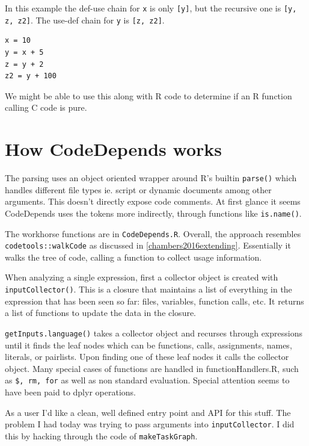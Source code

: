 \documentclass[12pt]{article}
\begin{document}
In this example the def-use chain for \texttt{x} is only \texttt{[y]}, but the
recursive one is \texttt{[y, z, z2]}. The use-def chain for \texttt{y} is
\texttt{[z, z2]}.

\begin{verbatim}
x = 10
y = x + 5
z = y + 2
z2 = y + 100
\end{verbatim}

We might be able to use this along with R code to determine if an R
function calling C code is pure.

\section{How CodeDepends works}

The parsing uses an object oriented wrapper around R's builtin \texttt{parse()}
which handles different file types ie. script or dynamic documents among other arguments.
This doesn't directly expose code comments.
At first glance it seems CodeDepends uses the tokens
more indirectly, through functions like \texttt{is.name()}. 

The workhorse functions are in \texttt{CodeDepends.R}. Overall, the
approach resembles \texttt{codetools::walkCode} as discussed in
\ref{chambers2016extending}. Essentially it walks the tree of code, calling
a function to collect usage information.

When analyzing a single expression, first a 
collector object is created with \texttt{inputCollector()}. This is a
closure that maintains a list of everything in the expression that has been seen
so far: files, variables, function calls, etc. It returns a list of
functions to update the data in the closure.

\texttt{getInputs.language()} takes a collector object and
recurses through expressions until it finds the leaf nodes which can be functions, calls, assignments,
names, literals, or pairlists. Upon finding one of these leaf nodes it
calls the collector object. 
Many special cases of functions are handled in functionHandlers.R, such as
\texttt{\$, rm, for} as well as non standard evaluation. Special attention seems
to have been paid to dplyr operations.

As a user I'd like a clean, well defined entry point and API for this
stuff. The problem I had today was trying to pass arguments into
\texttt{inputCollector}. I did this by hacking through the code of
\texttt{makeTaskGraph}.
\end{document}
